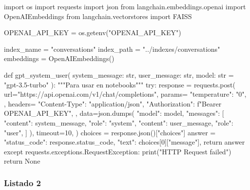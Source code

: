 \begin{APACode}
import os
import requests
import json
from langchain.embeddings.openai import OpenAIEmbeddings
from langchain.vectorstores import FAISS

OPENAI_API_KEY = os.getenv("OPENAI_API_KEY")

index_name = "conversations"
index_path = "../indexes/conversations"
embeddings = OpenAIEmbeddings()

def gpt_system_user(
    system_message: str, user_message: str, model: str = "gpt-3.5-turbo"
):
    """Para usar en notebooks"""
    try:
        response = requests.post(
            url="https://api.openai.com/v1/chat/completions",
            params={
                "temperature": "0",
            },
            headers={
                "Content-Type": "application/json",
                "Authorization": f"Bearer {OPENAI_API_KEY}",
            },
            data=json.dumps(
                {
                    "model": model,
                    "messages": [
                        {"content": system_message, "role": "system"},
                        {"content": user_message, "role": "user"},
                    ]
                }
            ),
            timeout=10,
        )
        choices = response.json()["choices"]
        answer = {
            "status_code": response.status_code,
            "text": choices[0]["message"],
        }
        return answer
    except requests.exceptions.RequestException:
        print("HTTP Request failed")
        return None
\end{APACode}

\subsubsection{Listado 2}
\label{anexo:code-4-1-12-2}

